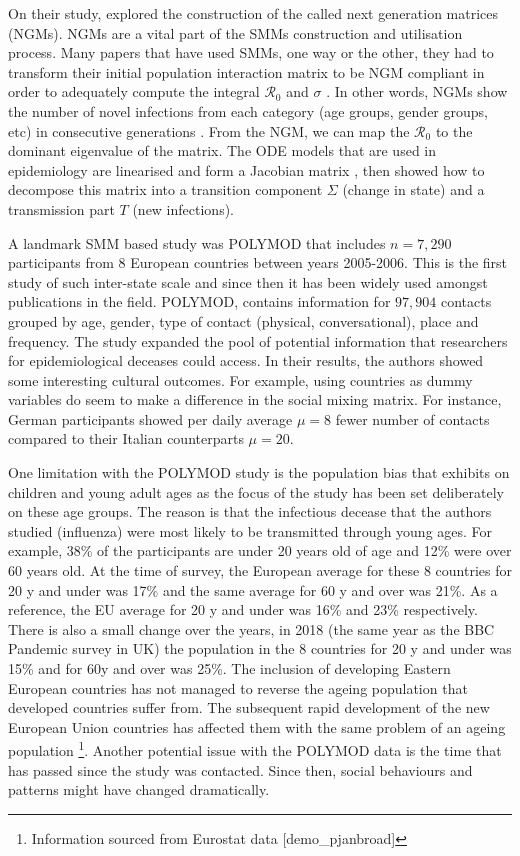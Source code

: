 \documentclass[12pt]{article}
\begin{document}
On their study, \cite{Diekmann:2010} explored the construction of the called next generation matrices (NGMs). NGMs are a vital part of the SMMs construction and utilisation process. Many papers that have used SMMs, one way or the other, they had to transform their initial population interaction matrix to be NGM compliant in order to adequately compute the integral $\mathcal{R}_{0} $ and $\sigma$ \cite{Mossong:2008, Fumanelli:2012, Klepac2020}. In other words, NGMs show the number of novel infections from each category (age groups, gender groups, etc) in consecutive generations \cite[p.874]{Diekmann:2010}. From the NGM, we can map the $\mathcal{R}_{0}$ to the dominant eigenvalue of the matrix. The ODE models that are used in epidemiology are linearised and form a Jacobian matrix \cite[Section 2.1.2]{keeling2008modeling}, then \cite{Diekmann:2010} showed how to decompose this matrix into a transition component $\Sigma$ (change in state) and a transmission part $T$ (new infections). 

A landmark SMM based study was POLYMOD \cite{Mossong:2008} that includes $n=7,290$ participants from 8 European countries between years 2005-2006. This is the first study of such inter-state scale and since then it has been widely used amongst publications in the field. POLYMOD, contains information for $97,904$ contacts grouped by age, gender, type of contact (physical, conversational), place and frequency. The study expanded the pool of potential information that researchers for epidemiological deceases could access. In their results, the authors showed some interesting cultural outcomes. For example, using countries as dummy variables do seem to make a difference in the social mixing matrix. For instance, German participants showed per daily average $\mu=8$ fewer number of contacts compared to their Italian counterparts $\mu=20$. 

One limitation with the POLYMOD study is the population bias that exhibits on children and young adult ages as the focus of the study has been set deliberately on these age groups. The reason is that the infectious decease that the authors studied (influenza) were most likely to be transmitted through young ages. For example, 38\% of the participants are under 20 years old of age and 12\% were over 60 years old. At the time of survey, the European average for these 8 countries for 20 y and under was 17\% and the same average for 60 y and over was 21\%. As a reference, the EU average for 20 y and under was 16\% and 23\% respectively. There is also a small change over the years, in 2018 (the same year as the BBC Pandemic survey in UK) the population in the 8 countries for 20 y and under was 15\% and for 60y and over was 25\%. The inclusion of developing Eastern European countries has not managed to reverse the ageing population that developed countries suffer from. The subsequent rapid development of the new European Union countries has affected them with the same problem of an ageing population \footnote{Information sourced from Eurostat data [demo\_pjanbroad]}. Another potential issue with the POLYMOD data is the time that has passed since the study was contacted. Since then, social behaviours and patterns might have changed dramatically. 
\end{document}
